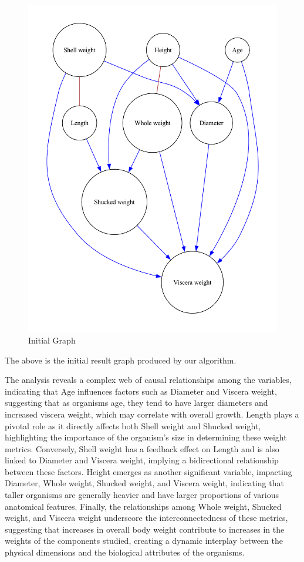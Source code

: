 \documentclass{article}
\begin{document}
\begin{figure}[H]
    \centering
    \includegraphics[height=0.3\textheight]{./demo_data/20241104_121546/Abalone/output_graph/initial_graph.pdf}
    \caption{Initial Graph}
\end{figure}

The above is the initial result graph produced by our algorithm.

The analysis reveals a complex web of causal relationships among the variables, indicating that Age influences factors such as Diameter and Viscera weight, suggesting that as organisms age, they tend to have larger diameters and increased viscera weight, which may correlate with overall growth. Length plays a pivotal role as it directly affects both Shell weight and Shucked weight, highlighting the importance of the organism's size in determining these weight metrics. Conversely, Shell weight has a feedback effect on Length and is also linked to Diameter and Viscera weight, implying a bidirectional relationship between these factors. Height emerges as another significant variable, impacting Diameter, Whole weight, Shucked weight, and Viscera weight, indicating that taller organisms are generally heavier and have larger proportions of various anatomical features. Finally, the relationships among Whole weight, Shucked weight, and Viscera weight underscore the interconnectedness of these metrics, suggesting that increases in overall body weight contribute to increases in the weights of the components studied, creating a dynamic interplay between the physical dimensions and the biological attributes of the organisms.
\end{document}
